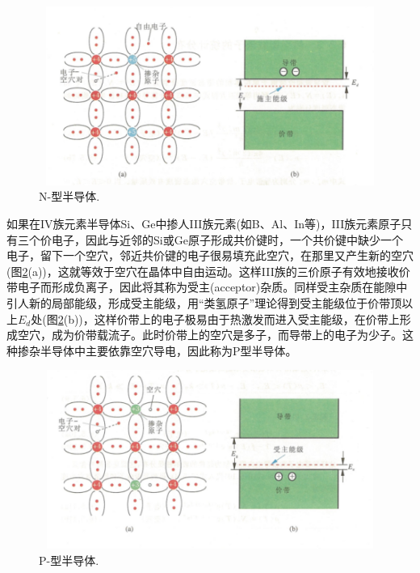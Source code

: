 \begin{figure}[h!]
\centering
\vspace*{-0.10in}
\includegraphics[height=2.30in,width=4.70in,viewport=0 0 105 55,clip]{Figures/N-semi_conductor.png}
\caption{\small \textrm{N-型半导体.}}%
\label{Fig:N-conductor}
\end{figure}

如果在IV族元素半导体Si、Ge中掺人III族元素(如B、Al、In等)，III族元素原子只有三个价电子，因此与近邻的Si或Ge原子形成共价键时，一个共价键中缺少一个电子，留下一个空穴，邻近共价键的电子很易填充此空穴，在那里又产生新的空穴(图\ref{Fig:P-conductor}(a))，这就等效于空穴在晶体中自由运动。这样III族的三价原子有效地接收价带电子而形成负离子，因此将其称为受主(acceptor)杂质。同样受主杂质在能隙中引人新的局部能级，形成受主能级，用``类氢原子''理论得到受主能级位于价带顶以上$E_d$处(图\ref{Fig:P-conductor}(b))，这样价带上的电子极易由于热激发而进入受主能级，在价带上形成空穴，成为价带载流子。此时价带上的空穴是多子，而导带上的电子为少子。这种掺杂半导体中主要依靠空穴导电，因此称为P型半导体。
\begin{figure}[h!]
\centering
\vspace*{-0.10in}
\includegraphics[height=2.30in,width=4.70in,viewport=0 0 105 60,clip]{Figures/P-semi_conductor.png}
\caption{\small \textrm{P-型半导体.}}%
\label{Fig:P-conductor}
\end{figure}



